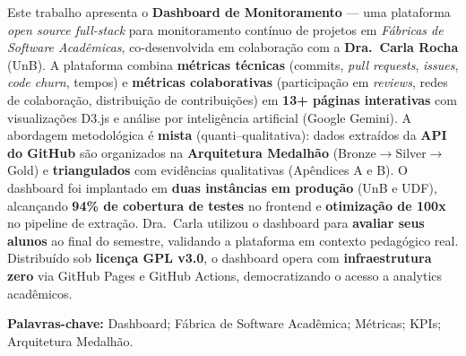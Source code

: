 \documentclass[
	12pt,
	openright,
	oneside,
	a4paper,
	brazil
]{abntex2}
\begin{document}
\frenchspacing

\imprimirfolhaderosto

\begin{resumo}
Este trabalho apresenta o \textbf{Dashboard de Monitoramento} --- uma plataforma \textit{open source full-stack} para monitoramento contínuo de projetos em \textit{Fábricas de Software Acadêmicas}, co-desenvolvida em colaboração com a \textbf{Dra.\ Carla Rocha} (UnB). A plataforma combina \textbf{métricas técnicas} (commits, \textit{pull requests}, \textit{issues}, \textit{code churn}, tempos) e \textbf{métricas colaborativas} (participação em \textit{reviews}, redes de colaboração, distribuição de contribuições) em \textbf{13+ páginas interativas} com visualizações D3.js e análise por inteligência artificial (Google Gemini). A abordagem metodológica é \textbf{mista} (quanti--qualitativa): dados extraídos da \textbf{API do GitHub} são organizados na \textbf{Arquitetura Medalhão} (Bronze$\rightarrow$Silver$\rightarrow$Gold) e \textbf{triangulados} com evidências qualitativas (Apêndices A e B). O dashboard foi implantado em \textbf{duas instâncias em produção} (UnB e UDF), alcançando \textbf{94\% de cobertura de testes} no frontend e \textbf{otimização de 100x} no pipeline de extração. Dra.\ Carla utilizou o dashboard para \textbf{avaliar seus alunos} ao final do semestre, validando a plataforma em contexto pedagógico real. Distribuído sob \textbf{licença GPL v3.0}, o dashboard opera com \textbf{infraestrutura zero} via GitHub Pages e GitHub Actions, democratizando o acesso a analytics acadêmicos.

\textbf{Palavras-chave:} Dashboard; Fábrica de Software Acadêmica; Métricas; KPIs; Arquitetura Medalhão.
\end{resumo}
\end{document}
